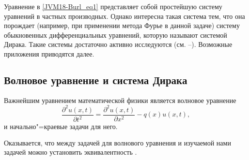 Уравнение в \eqref{JVM18-Burl_eq1} представляет собой простейшую
систему уравнений в частных производных. Однако интересна такая
система тем, что она порождает (например, при применении метода
Фурье в  данной задаче)   систему обыкновенных дифференциальных
уравнений, которую называют системой Дирака. Такие системы
достаточно активно исследуются (см. \cite{Burl2}--\cite{Burl6}).
Возможные приложения приводятся далее.


\subsection{ Волновое уравнение  и система Дирака}

Важнейшим уравнением математической физики является волновое
уравнение
$$\dfrac{{{\partial }^{2}}u(x,t)}{\partial
{{t}^{2}}}=\dfrac{{{\partial }^{2}}u(x,t)}{\partial
{{x}^{2}}}-q(x)u(x,t),$$ и начально"=краевые задачи для него.

Оказывается, что между задачей для волнового уравнения и изучаемой
нами задачей можно установить эквивалентность \cite{burl-VSU19-Kis}.

